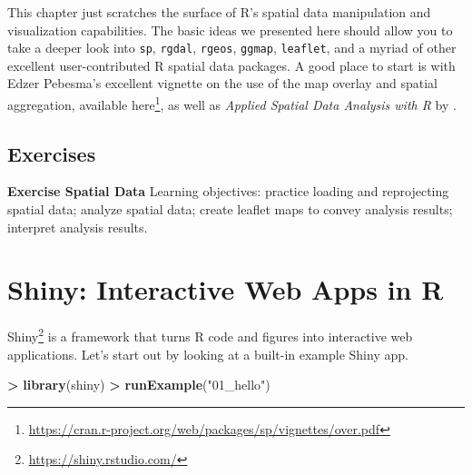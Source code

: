 \documentclass[
]{krantz}
\makeatletter
\newenvironment{Shaded}{\begin{snugshade}}{\end{snugshade}}
\newcommand{\KeywordTok}[1]{\textcolor[rgb]{0.27,0.27,0.27}{\textbf{#1}}}
\newcommand{\NormalTok}[1]{#1}
\newcommand{\OperatorTok}[1]{\textcolor[rgb]{0.43,0.43,0.43}{\textbf{#1}}}
\newcommand{\StringTok}[1]{\textcolor[rgb]{0.5,0.5,0.5}{#1}}
\renewcommand{\href}[2]{#2\footnote{\url{#1}}}
\newenvironment{kframe}{%
\medskip{}
\setlength{\fboxsep}{.8em}
 \def\at@end@of@kframe{}%
 \ifinner\ifhmode%
  \def\at@end@of@kframe{\end{minipage}}%
  \begin{minipage}{\columnwidth}%
 \fi\fi%
 \def\FrameCommand##1{\hskip\@totalleftmargin \hskip-\fboxsep
 \colorbox{shadecolor}{##1}\hskip-\fboxsep
     \hskip-\linewidth \hskip-\@totalleftmargin \hskip\columnwidth}%
 \MakeFramed {\advance\hsize-\width
   \@totalleftmargin\z@ \linewidth\hsize
   \@setminipage}}%
 {\par\unskip\endMakeFramed%
 \at@end@of@kframe}
\renewenvironment{Shaded}{\begin{kframe}}{\end{kframe}}
\makeatother
\begin{document}
This chapter just scratches the surface of R's spatial data manipulation and visualization capabilities. The basic ideas we presented here should allow you to take a deeper look into \texttt{sp}, \texttt{rgdal}, \texttt{rgeos}, \texttt{ggmap}, \texttt{leaflet}, and a myriad of other excellent user-contributed R spatial data packages. A good place to start is with Edzer Pebesma's excellent vignette on the use of the map overlay and spatial aggregation, available \href{https://cran.r-project.org/web/packages/sp/vignettes/over.pdf}{here}, as well as \emph{Applied Spatial Data Analysis with R} by \cite{Bivand13}.

\hypertarget{exercises-5}{%
\section{Exercises}\label{exercises-5}}

\textbf{Exercise Spatial Data} Learning objectives: practice loading and reprojecting spatial data; analyze spatial data; create leaflet maps to convey analysis results; interpret analysis results.

\hypertarget{shiny-interactive-web-apps-in-r}{%
\chapter{Shiny: Interactive Web Apps in R}\label{shiny-interactive-web-apps-in-r}}

\href{https://shiny.rstudio.com/}{Shiny} is a framework that turns R code and figures into interactive web applications. Let's start out by looking at a built-in example Shiny app.

\begin{Shaded}
\begin{Highlighting}[]
\OperatorTok{\textgreater{}}\StringTok{ }\KeywordTok{library}\NormalTok{(shiny)}
\OperatorTok{\textgreater{}}\StringTok{ }\KeywordTok{runExample}\NormalTok{(}\StringTok{"01\_hello"}\NormalTok{)}
\end{Highlighting}
\end{Shaded}
\end{document}
